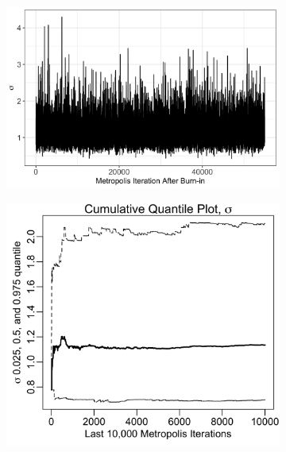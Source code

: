 \documentclass{uwstat572}
\begin{document}
\begin{figure}[H]
	\centering
	\begin{subfigure}[b]{\textwidth}
		\includegraphics[width=\textwidth]{figures/sigma_mcmc_chain.png}
		\caption{}
	\label{fig:quant_mu}
	\end{subfigure}
	\qquad
	\begin{subfigure}[b]{0.49\textwidth}
		\includegraphics[width=\textwidth]{figures/mcmc_cum_quant_plot_sigma.png}
		\caption{}
		\label{fig:quant_sigma}
	\end{subfigure}
	\hfill
	\begin{subfigure}[b]{0.49\textwidth}

\end{subfigure}
\end{figure}
\end{document}
